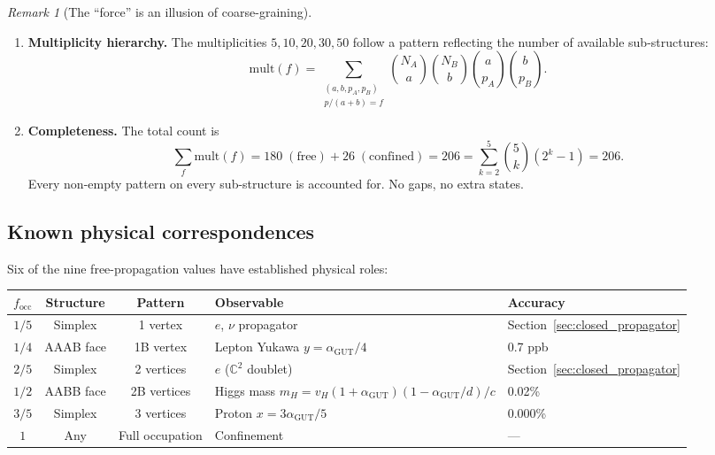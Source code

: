 \documentclass[12pt]{article}
\theoremstyle{remark}
\newtheorem{remark}[theorem]{Remark}
\theoremstyle{definition}
\newcommand{\CC}{\mathbb{C}}
\newcommand{\agut}{\alpha_{\mathrm{GUT}}}
\begin{document}
\begin{remark}[The ``force'' is an illusion of coarse-graining]
\begin{enumerate}
\item \textbf{Multiplicity hierarchy.}  The multiplicities $5, 10, 20, 30, 50$ follow a pattern reflecting the number of available sub-structures:
\begin{equation}
\mathrm{mult}(f) = \sum_{\substack{(a,b,p_A,p_B) \\ p/(a+b) = f}} \binom{N_A}{a}\binom{N_B}{b}\binom{a}{p_A}\binom{b}{p_B}.
\end{equation}

\item \textbf{Completeness.}  The total count is
\begin{equation}
\sum_f \mathrm{mult}(f) = 180\;(\text{free}) + 26\;(\text{confined}) = 206 = \sum_{k=2}^{5} \binom{5}{k}(2^k - 1) = 206.
\end{equation}
Every non-empty pattern on every sub-structure is accounted for.  No gaps, no extra states.
\end{enumerate}

\subsection{Known physical correspondences}
\label{sec:known_correspondences}

Six of the nine free-propagation values have established physical roles:

\begin{center}
\begin{tabular}{cccll}
\hline
$f_\mathrm{occ}$ & Structure & Pattern & Observable & Accuracy \\
\hline
$1/5$ & Simplex & 1 vertex & $e$, $\nu$ propagator & Section~\ref{sec:closed_propagator} \\
$1/4$ & AAAB face & 1B vertex & Lepton Yukawa $y = \agut/4$ & 0.7 ppb \\
$2/5$ & Simplex & 2 vertices & $e$ ($\CC^2$ doublet) & Section~\ref{sec:closed_propagator} \\
$1/2$ & AABB face & 2B vertices & Higgs mass $m_H = v_H(1+\agut)(1-\agut/d)/c$ & 0.02\% \\
$3/5$ & Simplex & 3 vertices & Proton $x = 3\agut/5$ & 0.000\% \\
$1$   & Any & Full occupation & Confinement & --- \\
\hline
\end{tabular}
\end{center}


\end{remark}
\end{document}
